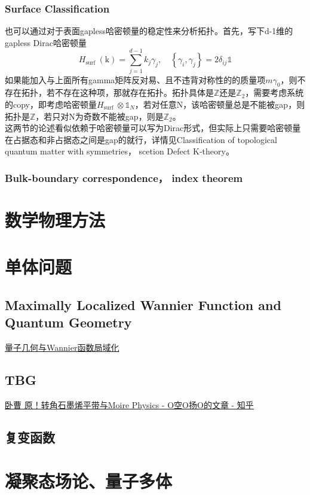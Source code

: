 \documentclass[10pt,openany]{book}
\theoremstyle{thmstyle} %
\theoremstyle{defstyle} %
\theoremstyle{prostyle} %
\begin{document}
\subsection{Surface Classification }
也可以通过对于表面gapless哈密顿量的稳定性来分析拓扑。首先，写下d-1维的gapless Dirac哈密顿量
\begin{equation}
  H_{\text {surf }}(\mathrm{k})=\sum_{j=1}^{d-1} k_j \gamma_j, \quad\left\{\gamma_i, \gamma_j\right\}=2 \delta_{i j} \mathbb{1}
\end{equation}
如果能加入与上面所有gamma矩阵反对易、且不违背对称性的的质量项$ m \gamma_0 $，则不存在拓扑，若不存在这种项，那就存在拓扑。拓扑具体是$ \mathbb{Z} $还是$ \mathbb{Z}_2 $，需要考虑系统的copy，即考虑哈密顿量$ H_{\text {surf }} \otimes \mathbb{1}_N $，若对任意N，该哈密顿量总是不能被gap，则拓扑是$\mathbb{Z}  $，若只对N为奇数不能被gap，则是$ \mathbb{Z}_2 $。\\
这两节的论述看似依赖于哈密顿量可以写为Dirac形式，但实际上只需要哈密顿量在占据态和非占据态之间是gap的就行，详情见Classification of topological quantum matter with symmetries， scetion Defect K-theory。
\subsection{Bulk-boundary correspondence， index theorem}     
\chapter{数学物理方法}
\chapter{单体问题}
\section{Maximally Localized Wannier Function and Quantum Geometry}
\href{https://zhuanlan.zhihu.com/p/629079639}{量子几何与Wannier函数局域化}
\section{TBG}
\href{https://zhuanlan.zhihu.com/p/675627432}{卧曹 原！转角石墨烯平带与Moire Physics - O空O扬O的文章 - 知乎
}
\section{复变函数}
\chapter{凝聚态场论、量子多体}
\end{document}
